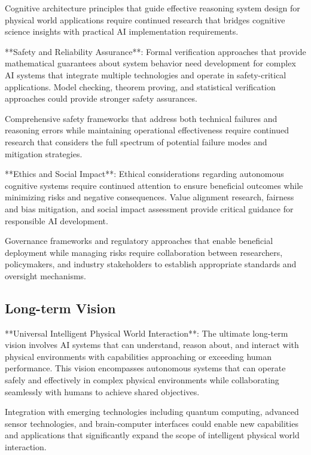 Cognitive architecture principles that guide effective reasoning system design for physical world applications require continued research that bridges cognitive science insights with practical AI implementation requirements.

**Safety and Reliability Assurance**:
Formal verification approaches that provide mathematical guarantees about system behavior need development for complex AI systems that integrate multiple technologies and operate in safety-critical applications. Model checking, theorem proving, and statistical verification approaches could provide stronger safety assurances.

Comprehensive safety frameworks that address both technical failures and reasoning errors while maintaining operational effectiveness require continued research that considers the full spectrum of potential failure modes and mitigation strategies.

**Ethics and Social Impact**:
Ethical considerations regarding autonomous cognitive systems require continued attention to ensure beneficial outcomes while minimizing risks and negative consequences. Value alignment research, fairness and bias mitigation, and social impact assessment provide critical guidance for responsible AI development.

Governance frameworks and regulatory approaches that enable beneficial deployment while managing risks require collaboration between researchers, policymakers, and industry stakeholders to establish appropriate standards and oversight mechanisms.

\subsection{Long-term Vision}

**Universal Intelligent Physical World Interaction**:
The ultimate long-term vision involves AI systems that can understand, reason about, and interact with physical environments with capabilities approaching or exceeding human performance. This vision encompasses autonomous systems that can operate safely and effectively in complex physical environments while collaborating seamlessly with humans to achieve shared objectives.

Integration with emerging technologies including quantum computing, advanced sensor technologies, and brain-computer interfaces could enable new capabilities and applications that significantly expand the scope of intelligent physical world interaction.

